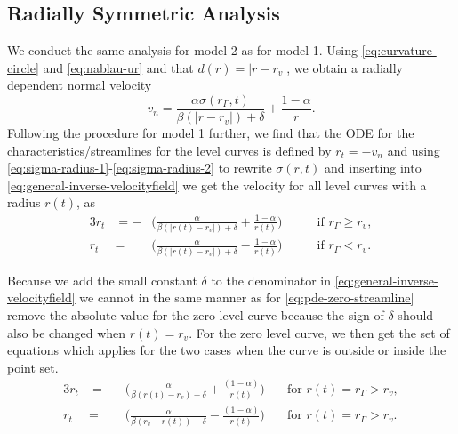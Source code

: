 \subsection{Radially Symmetric Analysis}
We conduct the same analysis for model 2 as for model 1. Using \eqref{eq:curvature-circle} and \eqref{eq:nablau-ur} and that $d(r)=|r-r_v|$, we obtain a radially dependent normal velocity
\begin{equation}
    v_n = \frac{\alpha \sigma(r_{\Gamma}, t)}{\beta (|r-r_v|)+\delta} + \frac{1-\alpha}{r}.
    \label{eq:general-inverse-velocityfield}
\end{equation}
Following the procedure for model 1 further, we find that the ODE for the characteristics/streamlines for the level curves is defined by $r_t = -v_n$ and using \eqref{eq:sigma-radius-1}-\eqref{eq:sigma-radius-2} to rewrite $\sigma(r, t)$ and inserting into \eqref{eq:general-inverse-velocityfield} we get the velocity for all level curves with a radius $r(t)$, as 
\begin{alignat}{3}
    r_t &= -&\bigg(\frac{\alpha }{\beta(|r(t)-r_v|)+\delta} + \frac{1-\alpha}{r(t)}\bigg) \qquad &\text{if }r_{\Gamma} \geq r_v,\\
    r_t &= &\bigg(\frac{\alpha}{\beta(|r(t)-r_v|)+\delta} -  \frac{1-\alpha}{r(t)}\bigg) \qquad &\text{if }r_{\Gamma} < r_v.
\end{alignat}

Because we add the small constant $\delta$ to the denominator in \eqref{eq:general-inverse-velocityfield} we cannot in the same manner as for \eqref{eq:pde-zero-streamline} remove the absolute value for the zero level curve because the sign of $\delta$ should also be changed when $r(t)=r_v$. For the zero level curve, we then get the set of equations which applies for the two cases when the curve is outside or inside the point set.
\begin{alignat}{3}
    r_t &= -&\bigg(\frac{\alpha}{\beta(r(t)-r_v)+\delta} + \frac{(1-\alpha)}{r(t)}\bigg) \quad &\text{for }r(t) = r_{\Gamma}>r_v, \label{eq:pde-zero-streamline-inverse-1} \\
    r_t &= &\bigg(\frac{\alpha}{\beta(r_v - r(t))+\delta} -  \frac{(1-\alpha)}{r(t)}\bigg) \quad &\text{for }r(t) = r_{\Gamma}>r_v.\label{eq:pde-zero-streamline-inverse-2}
\end{alignat}
    

